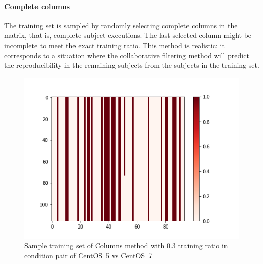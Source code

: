 \documentclass[10pt, conference, compsocconf]{IEEEtran}
\begin{document}
\paragraph{Complete columns}
The training set is sampled by randomly selecting complete columns in
the matrix, that is, complete subject executions. The last selected
column might be incomplete to meet the exact training ratio. This
method is realistic: it corresponds to a situation where the
collaborative filtering method will predict the reproducibility in the
remaining subjects from the subjects in the training set.
\begin{figure}
  \includegraphics[width=\columnwidth]{figures/5vs7_columns_0.3_training_plot.png}
  \caption{Sample training set of Columns method with 0.3 training ratio in condition pair of CentOS~5 vs CentOS~7}
  \label{fig:Sample Training set }
\end{figure}
\end{document}
